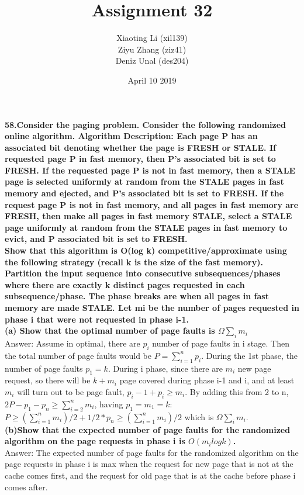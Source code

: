 \documentclass{article}
\title{Assignment 32}
\author{Xiaoting Li (xil139) \\
Ziyu Zhang (ziz41) \\
Deniz Unal (des204)}
\date{April 10 2019}
\begin{document}
\maketitle
\noindent
\textbf{58.Consider the paging problem. Consider the following randomized online algorithm. Algorithm Description: Each page P has an associated bit denoting whether the page is FRESH or STALE. If requested page P in fast memory, then P’s associated bit is set to FRESH. If the requested page P is not in fast memory, then a STALE page is selected uniformly at random from the STALE pages in fast memory and ejected, and P’s associated bit is set to FRESH. If the request page P is not in fast memory, and all pages in fast memory are FRESH, then make all pages in fast memory STALE, select a STALE page uniformly at random from the STALE pages in fast memory to evict, and P associated bit is set to FRESH. \\ \newline Show that this algorithm is O(log k) competitive/approximate using the following strategy (recall k is the size of the fast memory). Partition the input sequence into consecutive subsequences/phases where there are exactly k distinct pages requested in each subsequence/phase. The phase breaks are when all pages in fast memory are made STALE. Let mi be the number of pages requested in phase i that were not requested
in phase i-1.} \\ \newline
\textbf{(a) Show that the optimal number of page faults is $\Omega \sum_{i} m_i$} \\ \newline
Answer: Assume in optimal, there are $p_i$ number of page faults in i stage. Then the total number of page faults would be $P = \sum_{i=1}^{n} p_i$.
During the 1st phase, the number of page faults $p_1 = k$. During i phase, since there are $m_i$ new page request, so there will be $k+m_i$ page covered during phase i-1 and i, and at least $m_i$ will turn out to be page fault, $p_i-1 + p_i \geq m_i$. By adding this from 2 to n, $2P -p_1-p_n\geq \sum_{i=2}^{n} m_i$, having $p_1 = m_1 = k$: $P \geq (\sum_{i=1}^{n} m_i) /2 + 1/2*p_n \geq (\sum_{i=1}^{n} m_i) /2$ which is $\Omega \sum_{i} m_i$.
\\ \newline
\textbf{(b)Show that the expected number of page faults for the randomized algorithm on the page requests in phase i is $O(m_i
log k)$.} \\ \newline
Answer: The expected number of page faults for the randomized algorithm on the page requests in phase i is max when the request for new page that is not at the cache comes first, and the request for old page that is at the cache before phase i comes after.
\end{document}
